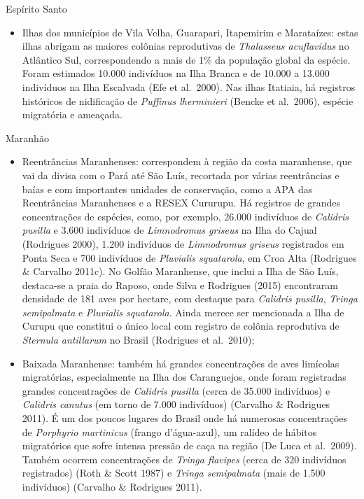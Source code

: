 \documentclass[
  oneside]{scrbook}
\providecommand{\tightlist}{%
  \setlength{\itemsep}{0pt}\setlength{\parskip}{0pt}}
\begin{document}
Espírito Santo

\begin{itemize}
\tightlist
\item
  Ilhas dos municípios de Vila Velha, Guarapari, Itapemirim e Marataízes: estas ilhas abrigam as maiores colônias reprodutivas de \emph{Thalasseus acuflavidus} no Atlântico Sul, correspondendo a mais de 1\% da população global da espécie. Foram estimados 10.000 indivíduos na Ilha Branca e de 10.000 a 13.000 indivíduos na Ilha Escalvada (Efe et al.~2000). Nas ilhas Itatiaia, há registros históricos de nidificação de \emph{Puffinus lherminieri} (Bencke et al.~2006), espécie migratória e ameaçada.
\end{itemize}

Maranhão

\begin{itemize}
\item
  Reentrâncias Maranhenses: correspondem à região da costa maranhense, que vai da divisa com o Pará até São Luís, recortada por várias reentrâncias e baías e com importantes unidades de conservação, como a APA das Reentrâncias Maranhenses e a RESEX Cururupu. Há registros de grandes concentrações de espécies, como, por exemplo, 26.000 indivíduos de \emph{Calidris pusilla} e 3.600 indivíduos de \emph{Limnodromus griseus} na Ilha do Cajual (Rodrigues 2000), 1.200 indivíduos de \emph{Limnodromus griseus} registrados em Ponta Seca e 700 indivíduos de \emph{Pluvialis squatarola}, em Croa Alta (Rodrigues \& Carvalho 2011c). No Golfão Maranhense, que inclui a Ilha de São Luís, destaca-se a praia do Raposo, onde Silva e Rodrigues (2015) encontraram densidade de 181 aves por hectare, com destaque para \emph{Calidris pusilla}, \emph{Tringa semipalmata} e \emph{Pluvialis squatarola}. Ainda merece ser mencionada a Ilha de Curupu que constitui o único local com registro de colônia reprodutiva de \emph{Sternula antillarum} no Brasil (Rodrigues et al.~2010);
\item
  Baixada Maranhense: também há grandes concentrações de aves limícolas migratórias, especialmente na Ilha dos Caranguejos, onde foram registradas grandes concentrações de \emph{Calidris pusilla} (cerca de 35.000 indivíduos) e \emph{Calidris canutus} (em torno de 7.000 indivíduos) (Carvalho \& Rodrigues 2011). É um dos poucos lugares do Brasil onde há numerosas concentrações de \emph{Porphyrio martinicus} (frango d'água-azul), um ralídeo de hábitos migratórios que sofre intensa pressão de caça na região (De Luca et al.~2009). Também ocorrem concentrações de \emph{Tringa flavipes} (cerca de 320 indivíduos registrados) (Roth \& Scott 1987) e \emph{Tringa semipalmata} (mais de 1.500 indivíduos) (Carvalho \& Rodrigues 2011).
\end{itemize}
\end{document}

